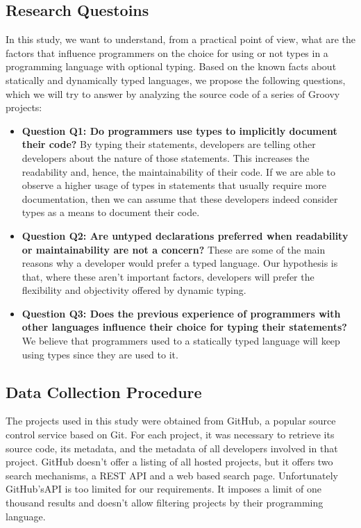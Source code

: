 \documentclass[preprint]{sigplanconf}
\begin{document}
\subsection{Research Questoins\label{questions}}

In this study, we want to understand, from a practical point of view, what are the factors that influence programmers on the choice for using or not types in a programming language with optional typing.
Based on the known facts about statically and dynamically typed languages, we propose the following questions, which we will try to answer by analyzing the source code of a series of Groovy projects:

\begin{itemize}
	\item \textbf{Question Q1: Do programmers use types to implicitly document their code?} By typing their statements, developers are telling other developers about the nature of those statements. This increases the readability and, hence, the maintainability of their code. If we are able to observe a higher usage of types in statements that usually require more documentation, then we can assume that these developers indeed consider types as a means to document their code.
	\item \textbf{Question Q2: Are untyped declarations preferred when readability or maintainability are not a concern?} These are some of the main reasons why a developer would prefer a typed language. Our hypothesis is that, where these aren't important factors, developers will prefer the flexibility and objectivity offered by dynamic typing. 
	\item \textbf{Question Q3: Does the previous experience of programmers with other languages influence their choice for typing their statements?} We believe that programmers used to a statically typed language will keep using types since they are used to it. 
\end{itemize}

\subsection{Data Collection Procedure\label{dataCollection}}
The projects used in this study were obtained from GitHub, a popular source control service based on Git.
For each project, it was necessary to retrieve its source code, its metadata, and the metadata of all developers involved in that project.
GitHub doesn't offer a listing of all hosted projects, but it offers two search mechanisms, a REST API and a web based search page.
Unfortunately GitHub'sAPI is too limited for our requirements.
It imposes a limit of one thousand results and doesn't allow filtering projects by their programming language.
\end{document}
